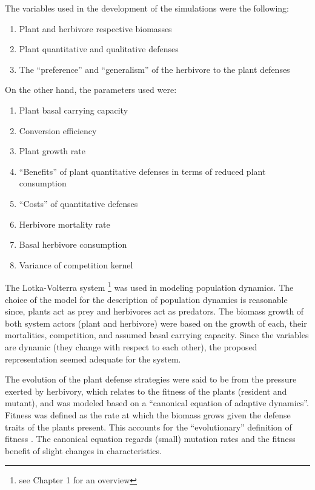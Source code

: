 The variables used in the development of the simulations were the following:

\begin{enumerate}
    \item Plant and herbivore respective biomasses
    \item Plant quantitative and qualitative defenses
    \item The ``preference'' and ``generalism'' of the herbivore to the plant defenses
\end{enumerate}

On the other hand, the parameters used were:

\begin{enumerate}
    \item Plant basal carrying capacity
    \item Conversion efficiency
    \item Plant growth rate
    \item ``Benefits'' of plant quantitative defenses in terms of reduced plant consumption
    \item ``Costs'' of quantitative defenses
    \item Herbivore mortality rate
    \item Basal herbivore consumption
    \item Variance of competition kernel
\end{enumerate}

The Lotka-Volterra system \footnote{see Chapter 1 for an overview} was used in modeling population dynamics.
The choice of the model for the description of population dynamics is reasonable since, plants act as prey and herbivores act as predators.
The biomass growth of both system actors (plant and herbivore) were based on the growth of each, their mortalities, competition, and assumed basal carrying capacity.
Since the variables are dynamic (they change with respect to each other), the proposed representation seemed adequate for the system.

The evolution of the plant defense strategies were said to be from the pressure exerted by herbivory, which relates to the fitness of the plants (resident and mutant),
and was modeled based on a ``canonical equation of adaptive dynamics''.
Fitness was defined as the rate at which the biomass grows given the defense traits of the plants present.
This accounts for the ``evolutionary'' definition of fitness \cite{Ridley}.
The canonical equation regards (small) mutation rates and the fitness benefit of slight changes in characteristics.

